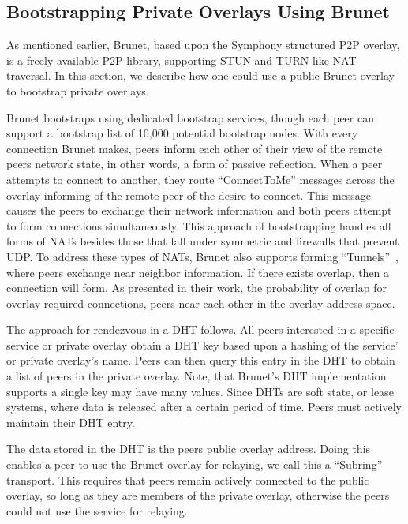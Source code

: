 \documentclass[conference]{IEEEtran}
\begin{document}
\subsection{Bootstrapping Private Overlays Using Brunet}
\label{brunet_bootstrapping}

As mentioned earlier, Brunet, based upon the Symphony structured P2P overlay,
is a freely available P2P library, supporting STUN and TURN-like NAT traversal.
In this section, we describe how one could use a public Brunet overlay to
bootstrap private overlays.  

Brunet bootstraps using dedicated bootstrap services, though each peer can
support a bootstrap list of 10,000 potential bootstrap nodes.  With every
connection Brunet makes, peers inform each other of their view of the remote
peers network state, in other words, a form of passive reflection.  When a peer
attempts to connect to another, they route ``ConnectToMe'' messages across the
overlay informing of the remote peer of the desire to connect.  This message
causes the peers to exchange their network information and both peers attempt
to form connections simultaneously.  This approach of bootstrapping handles
all forms of NATs besides those that fall under symmetric and firewalls that
prevent UDP.  To address these types of NATs, Brunet also supports forming
``Tunnels''~\cite{hpdc08_0}, where peers exchange near neighbor information.
If there exists overlap, then a connection will form.  As presented in their
work, the probability of overlap for overlay required connections, peers near
each other in the overlay address space.

The approach for rendezvous in a DHT follows.  All peers interested in a
specific service or private overlay obtain a DHT key based upon a hashing of
the service' or private overlay's name.  Peers can then query this entry in the
DHT to obtain a list of peers in the private overlay.  Note, that Brunet's DHT
implementation supports a single key may have many values.  Since DHTs are
soft state, or lease systems, where data is released after a certain period of
time.  Peers must actively maintain their DHT entry.  

The data stored in the DHT is the peers public overlay address.  Doing this
enables a peer to use the Brunet overlay for relaying, we call this a
``Subring'' transport.  This requires that peers remain actively connected to
the public overlay, so long as they are members of the private overlay,
otherwise the peers could not use the service for relaying.
\end{document}
